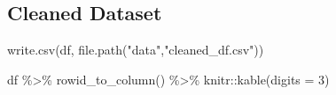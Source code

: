 \documentclass[
  letterpaper,
  DIV=11,
  numbers=noendperiod]{scrartcl}
\newenvironment{Shaded}{\begin{snugshade}}{\end{snugshade}}
\newcommand{\AttributeTok}[1]{\textcolor[rgb]{0.40,0.45,0.13}{#1}}
\newcommand{\DecValTok}[1]{\textcolor[rgb]{0.68,0.00,0.00}{#1}}
\newcommand{\FunctionTok}[1]{\textcolor[rgb]{0.28,0.35,0.67}{#1}}
\newcommand{\NormalTok}[1]{\textcolor[rgb]{0.00,0.23,0.31}{#1}}
\newcommand{\SpecialCharTok}[1]{\textcolor[rgb]{0.37,0.37,0.37}{#1}}
\newcommand{\StringTok}[1]{\textcolor[rgb]{0.13,0.47,0.30}{#1}}
\begin{document}
\subsection{Cleaned Dataset}\label{cleaned-dataset}

\begin{Shaded}
\begin{Highlighting}[]
\FunctionTok{write.csv}\NormalTok{(df, }\FunctionTok{file.path}\NormalTok{(}\StringTok{"data"}\NormalTok{,}\StringTok{"cleaned\_df.csv"}\NormalTok{))}

\NormalTok{df }\SpecialCharTok{\%\textgreater{}\%}
   \FunctionTok{rowid\_to\_column}\NormalTok{() }\SpecialCharTok{\%\textgreater{}\%}
\NormalTok{   knitr}\SpecialCharTok{::}\FunctionTok{kable}\NormalTok{(}\AttributeTok{digits =} \DecValTok{3}\NormalTok{)}
\end{Highlighting}
\end{Shaded}
\end{document}
